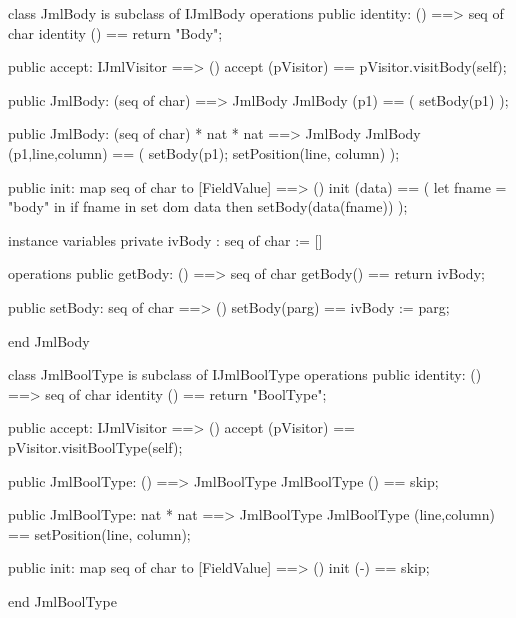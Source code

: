 \begin{vdm_al}
class JmlBody is subclass of IJmlBody
operations
  public identity: () ==> seq of char
  identity () == return "Body";

  public accept: IJmlVisitor ==> ()
  accept (pVisitor) == pVisitor.visitBody(self);

  public JmlBody:
    (seq of char) ==> JmlBody
  JmlBody (p1) == 
    ( setBody(p1) );

  public JmlBody:
    (seq of char) *
    nat *
    nat ==> JmlBody
  JmlBody (p1,line,column) == 
    ( setBody(p1);
      setPosition(line, column) );

  public init: map seq of char to [FieldValue] ==> ()
  init (data) ==
    ( let fname = "body" in
        if fname in set dom data
        then setBody(data(fname)) );

instance variables
  private ivBody : seq of char := []

operations
  public getBody: () ==> seq of char
  getBody() == return ivBody;

  public setBody: seq of char ==> ()
  setBody(parg) == ivBody := parg;

end JmlBody
\end{vdm_al}

\begin{vdm_al}
class JmlBoolType is subclass of IJmlBoolType
operations
  public identity: () ==> seq of char
  identity () == return "BoolType";

  public accept: IJmlVisitor ==> ()
  accept (pVisitor) == pVisitor.visitBoolType(self);

  public JmlBoolType:
    () ==> JmlBoolType
  JmlBoolType () == 
    skip;

  public JmlBoolType:
    nat *
    nat ==> JmlBoolType
  JmlBoolType (line,column) == 
    setPosition(line, column);

  public init: map seq of char to [FieldValue] ==> ()
  init (-) == skip;

end JmlBoolType
\end{vdm_al}

